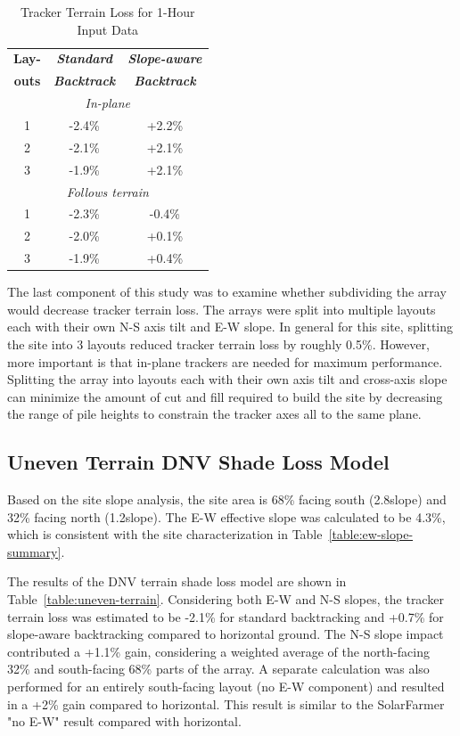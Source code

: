 \documentclass[conference]{IEEEtran}
\begin{document}
\begin{table}[htbp]
\caption{Tracker Terrain Loss for 1-Hour Input Data}
\begin{center}
\begin{tabular}{|c|c|c|}
\hline
\textbf{Lay-}& \textbf{\textit{Standard}}& \textbf{\textit{Slope-aware}}\\
\textbf{outs}& \textbf{\textit{Backtrack}}&    \textbf{\textit{Backtrack}} \\
\hline
\multicolumn{3}{|c|}{\textit{In-plane}} \\
\hline
1& -2.4\% & +2.2\%  \\
\hline
2& -2.1\% & +2.1\%  \\
\hline
3& -1.9\% & +2.1\%  \\
\hline
\multicolumn{3}{|c|}{\textit{Follows terrain}} \\
\hline
1& -2.3\% & -0.4\%  \\
\hline
2& -2.0\% & +0.1\%  \\
\hline
3& -1.9\% & +0.4\%  \\
\hline
\end{tabular}
\label{table:terrain-loss-1hr}
\end{center}
\end{table}

The last component of this study was to examine whether subdividing the array would decrease tracker terrain loss. The arrays were split into multiple layouts each with their own N-S axis tilt and E-W slope. In general for this site, splitting the site into 3 layouts reduced tracker terrain loss by roughly 0.5\%. However, more important is that in-plane trackers are needed for maximum performance. Splitting the array into layouts each with their own axis tilt and cross-axis slope can minimize the amount of cut and fill required to build the site by decreasing the range of pile heights to constrain the tracker axes all to the same plane.

\subsection{Uneven Terrain DNV Shade Loss Model}
Based on the site slope analysis, the site area is 68\% facing south (2.8\degree  slope) and 32\% facing north (1.2\degree  slope). The E-W effective slope was calculated to be 4.3\%, which is consistent with the site characterization in Table~\ref{table:ew-slope-summary}. 

The results of the DNV terrain shade loss model are shown in Table~\ref{table:uneven-terrain}. Considering both E-W and N-S slopes, the tracker terrain loss was estimated to be -2.1\% for standard backtracking and +0.7\% for slope-aware backtracking compared to horizontal ground. The N-S slope impact contributed a +1.1\% gain, considering a weighted average of the north-facing 32\% and south-facing 68\% parts of the array. A separate calculation was also performed for an entirely south-facing layout (no E-W component) and resulted in a +2\% gain compared to horizontal. This result is similar to the SolarFarmer "no E-W" result compared with horizontal.    
\end{document}
